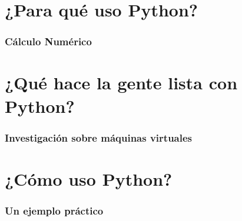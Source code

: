 \documentclass[12pt,mathserif,compress]{beamer}
\begin{document}
\section{¿Para qué uso Python?}
\begin{frame}
  \frametitle{Cálculo Numérico}
\end{frame}

\section{¿Qué hace la gente lista con Python?}

\begin{frame}
  \frametitle{Investigación sobre máquinas virtuales}
\end{frame}
\section{¿Cómo uso Python?}

\begin{frame}
  \frametitle{Un ejemplo práctico}
\end{frame}
\end{document}
